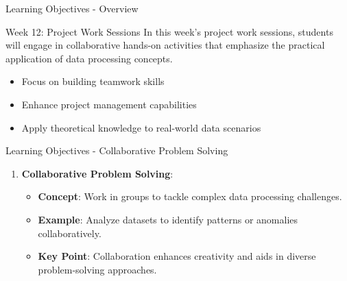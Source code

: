 \documentclass[aspectratio=169]{beamer}
\begin{document}
\begin{frame}[fragile]{Learning Objectives - Overview}
    \begin{block}{Week 12: Project Work Sessions}
        In this week's project work sessions, students will engage in collaborative hands-on activities that emphasize the practical application of data processing concepts.
    \end{block}
    \begin{itemize}
        \item Focus on building teamwork skills
        \item Enhance project management capabilities
        \item Apply theoretical knowledge to real-world data scenarios
    \end{itemize}
\end{frame}

\begin{frame}[fragile]{Learning Objectives - Collaborative Problem Solving}
    \begin{enumerate}
        \item \textbf{Collaborative Problem Solving}:
            \begin{itemize}
                \item \textbf{Concept}: Work in groups to tackle complex data processing challenges.
                \item \textbf{Example}: Analyze datasets to identify patterns or anomalies collaboratively.
                \item \textbf{Key Point}: Collaboration enhances creativity and aids in diverse problem-solving approaches.
            \end{itemize}
    \end{enumerate}
\end{frame}
\end{document}
